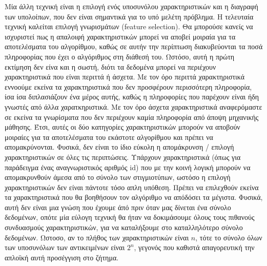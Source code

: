 \documentclass[12pt]{article}
\begin{document}
Μία άλλη τεχνική είναι η επιλογή ενός υποσυνόλου χαρακτηριστικών και η διαγραφή των υπολοίπων, που δεν είναι σημαντικά για το υπό μελέτη πρόβλημα. Η τελευταία τεχνική καλείται επιλογή γνωρισμάτων (feature selection). Θα μπορούσε κανείς να ισχυριστεί πως η απαλοιφή χαρακτηριστικών μπορεί να αποβεί μοιραία για τα αποτελέσματα του αλγορίθμου, καθώς σε αυτήν την περίπτωση διακυβεύονται τα ποσά πληροφορίας που έχει ο αλγόριθμος στη διάθεσή του. Ωστόσο, αυτή η πρώτη εκτίμηση δεν είνα και η σωστή, διότι τα δεδομένα μπορεί να περιέχουν χαρακτηριστικά που είναι περιττά ή άσχετα. Με τον όρο περιττά χαρακτηριστικά εννοούμε εκείνα τα χαρακτηριστικά που δεν προσφέρουν περισσότερη πληροφορία, ίσα ίσα διπλασιάζουν ένα μέρος αυτής, καθώς η πληροφορίες που παρέχουν είναι ήδη γνωστές από άλλα χαρατκηριστικά. Με τον όρο άσχετα χαρακτηριστικά αναφερόμαστε σε εκείνα τα γνωρίσματα που δεν περιέχουν καμία πληροφορία από άποψη μηχανικής μάθησης. Έτσι, αυτές οι δύο κατηγορίες χαρακτηριστικών μπορούν να αποβούν μοιραίες για τα αποτελέσματα του εκάστοτε αλγορίθμου και πρέπει να απομακρύνονται. Φυσικά, δεν είναι το ίδιο εύκολη η απομάκρυνση / επιλογή χαρακτηριστικών σε όλες τις περιπτώσεις. Υπάρχουν χαρακτηριστικά (όπως για παράδειγμα ένας αναγνωριστικός αριθμός id) που με την κοινή λογική μπορούν να απομακρυνθούν άμεσα από το σύνολο των στιγμιοτύπων, ωστόσο η επιλογή χαρακτηριστικών δεν είναι πάντοτε τόσο απλη υπόθεση. Πρέπει να επιλεχθούν εκείνα τα χαρακτηριστικά που θα βοηθήσουν τον αλγόριθμο να απόδόσει τα μέγιστα. Φυσικά, αυτή δεν είναι μια γνώση που έχουμε άπό πριν όταν μας δίνεται ένα σύνολο δεδομένων, οπότε μία εύλογη τεχνική θα ήταν να δοκιμάσουμε όλους τους πιθανούς συνδυασμούς χαρακτηριστικών, για να καταλήξουμε στο καταλληλότερο σύνολο δεδομένων. Ωστοσο, αν το πλήθος των χαρακτηριστικών είναι \(n\), τότε το σύνολο όλων των υποσυνόλων των αντικειμένων είναι \(2^n\), γεγονός που καθιστά απαγορευτική την απλοϊκή αυτή προσέγγιση στο ζήτημα.  \\

\pagebreak
\end{document}
